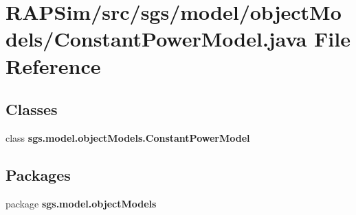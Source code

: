 \section{R\-A\-P\-Sim/src/sgs/model/object\-Models/\-Constant\-Power\-Model.java File Reference}
\label{_constant_power_model_8java}
\subsection*{Classes}
\begin{DoxyCompactItemize}
\item 
class {\bf sgs.\-model.\-object\-Models.\-Constant\-Power\-Model}
\end{DoxyCompactItemize}
\subsection*{Packages}
\begin{DoxyCompactItemize}
\item 
package {\bf sgs.\-model.\-object\-Models}
\end{DoxyCompactItemize}
